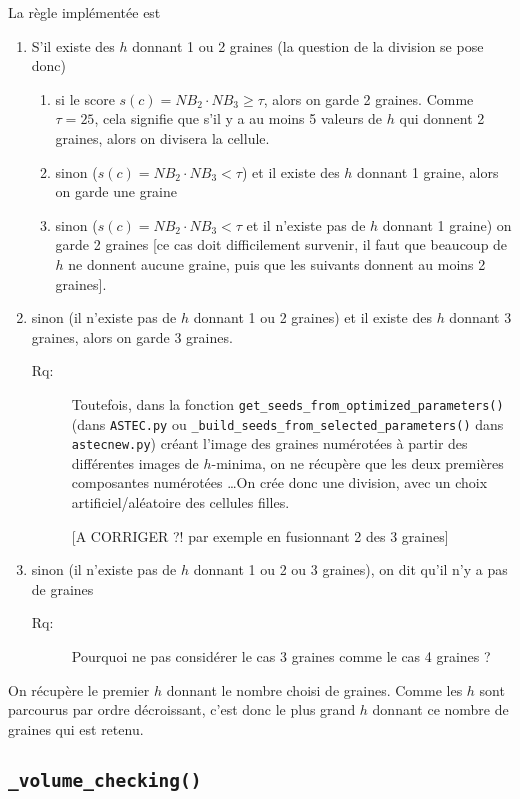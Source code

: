 \documentclass{article}
\newenvironment{remarque}{\color{red}\begin{description}\item[Rq:]}
{\end{description}\color{black}}
\begin{document}
La r\`egle impl\'ement\'ee est 
\begin{enumerate}
\itemsep -0.5ex
\item S'il existe des $h$ donnant 1 ou 2 graines (la question de la division se pose donc)
\begin{enumerate}
\itemsep -0.5ex
\item si le score $s(c) = NB_2 \cdot NB_3 \geq \tau$, alors on garde 2 graines. Comme $\tau = 25$, cela signifie que s'il y a au moins 5 valeurs de $h$ qui donnent 2 graines, alors on divisera la cellule.
\item sinon ($s(c) = NB_2 \cdot NB_3 <\tau$) et il existe des $h$ donnant 1 graine, alors on garde une graine
\item sinon ($s(c) = NB_2 \cdot NB_3 <\tau$ et il n'existe pas de $h$ donnant 1 graine) on garde 2 graines [ce cas doit difficilement survenir, il faut que beaucoup de $h$ ne donnent aucune graine, puis que les suivants donnent au moins 2 graines].
\end{enumerate}
\item sinon (il n'existe pas de $h$ donnant 1 ou 2 graines) et il existe des $h$ donnant 3 graines, alors on garde 3 graines.
\begin{remarque}
Toutefois, dans la fonction \verb|get_seeds_from_optimized_parameters()| (dans \verb|ASTEC.py| ou \verb|_build_seeds_from_selected_parameters()| dans \verb|astecnew.py|)
cr\'eant l'image des graines num\'erot\'ees \`a partir des diff\'erentes images de $h$-minima, on ne r\'ecup\`ere que les deux premi\`eres composantes num\'erot\'ees \ldots On cr\'ee donc une division, avec un choix artificiel/al\'eatoire des cellules filles.

[A CORRIGER ?! par exemple en fusionnant 2 des 3 graines]

\end{remarque}

\item sinon  (il n'existe pas de $h$ donnant 1 ou 2 ou 3 graines), on dit qu'il n'y a pas de graines
\begin{remarque}
Pourquoi ne pas consid\'erer le cas 3 graines comme le cas 4 graines ?
\end{remarque}
\end{enumerate}
On r\'ecup\`ere le premier $h$ donnant le nombre choisi de graines. Comme les $h$ sont parcourus par ordre d\'ecroissant, c'est donc le plus grand $h$ donnant ce nombre de graines qui est retenu.
\color{black}


\subsection{\texttt{\_volume\_checking()}}
\end{document}
